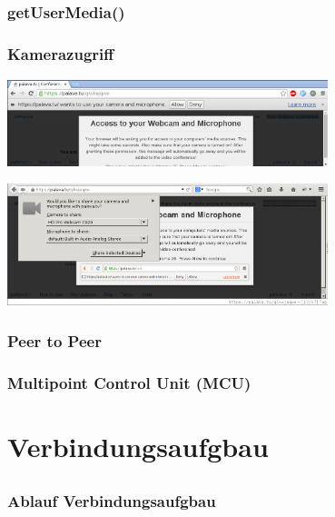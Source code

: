 \documentclass[12pt]{beamer}
\begin{document}
\subsection{} 

\begin{frame}
  \frametitle{getUserMedia()}
  \pause
  
\end{frame}

\begin{frame}
  \frametitle{Kamerazugriff}
  \pause
  \centerline{\includegraphics[width=0.7\textwidth]{img/access_chrome.png}}
  \vspace{15pt}
  \centerline{\includegraphics[width=0.7\textwidth]{img/access_firefox.png}}
\end{frame}

\begin{frame}
  \frametitle{Peer to Peer}
  \pause
  \centerline{}
\end{frame}

\begin{frame}
  \frametitle{Multipoint Control Unit (MCU)}
  \pause
  \centerline{}
\end{frame}


\section{Verbindungsaufgbau}
\subsection{} 

\begin{frame}
  \frametitle{Ablauf Verbindungsaufgbau}
  \centerline{}
\end{frame}
\end{document}
